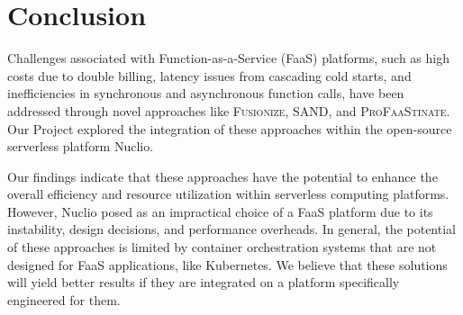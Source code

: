 \section{Conclusion}\label{sec:conclusion}

Challenges associated with Function-as-a-Service (FaaS) platforms, such as high
costs due to double billing, latency issues from cascading cold starts, and
inefficiencies in synchronous and asynchronous function calls, have been
addressed through novel approaches like \textsc{Fusionize}, SAND, and
\textsc{ProFaaStinate}. Our Project explored the integration of these approaches
within the open-source serverless platform Nuclio.

Our findings indicate that these approaches have the potential to enhance the
overall efficiency and resource utilization within serverless computing
platforms. However, Nuclio posed as an impractical choice of a FaaS platform due
to its instability, design decisions, and performance overheads. In general, the
potential of these approaches is limited by container orchestration systems that
are not designed for FaaS applications, like Kubernetes. We believe that these
solutions will yield better results if they are integrated on a platform
specifically engineered for them.
